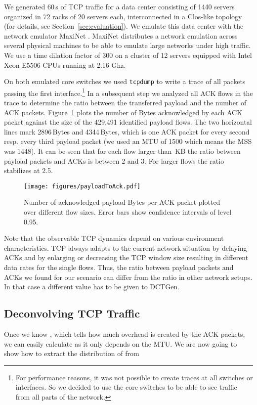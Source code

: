 \documentclass[journal,10pt]{IEEEtran}
\newcommand{\genname}{DCTGen}
\begin{document}
	
	We generated 60\,s of TCP traffic for a data center
	consisting of 1440 servers organized in 72 racks of 20 servers each, interconnected in a Clos-like topology (for details, see Section~\ref{sec:evaluation}).
	We emulate this data center with the network emulator MaxiNet \cite{wette14b}.
    \mbox{MaxiNet} distributes a network emulation across several physical machines
	to be able to emulate large networks under high traffic. We use a time dilation factor of 300 
	on a cluster of 12 servers equipped with Intel Xeon E5506 CPUs running at 2.16 Ghz.
	

	
	On both emulated core switches we used \texttt{tcpdump} to write a trace of all packets passing the first interface.\footnote{For performance reasons, it was not possible to create traces at all switches or interfaces. So we decided to use the core switches to be able to see traffic from all parts of the network.}
	In a subsequent step we analyzed all ACK flows in the trace to determine the ratio between the transferred payload and the number of ACK packets.
	Figure~\ref{fig:payloadToAck} plots the number of Bytes acknowledged by each ACK packet against the size of the 429,491 identified payload flows.
	The two horizontal lines mark 2896\,Bytes and 4344\,Bytes, which is one ACK packet for every second resp. every third payload packet (we used an MTU of 1500 which means the MSS was 1448).
	It can be seen that for each flow larger than \,KB the ratio between payload packets and ACKs is between 2 and 3. For larger flows
	the ratio stabilizes at 2.5.
	
\begin{figure}
	\centering
	\texttt{[image: figures/payloadToAck.pdf]}
	\caption{Number of acknowledged payload Bytes per ACK packet plotted over different flow sizes. Error bars show confidence intervals of level 0.95.}
	\label{fig:payloadToAck}
\end{figure}
	
	Note that the observable TCP dynamics depend on various environment characteristics.
	TCP always adapts to the current network situation by delaying ACKs and by enlarging or decreasing the TCP window size resulting in different data rates
	for the single flows.
Thus, the ratio between payload packets and ACKs we found for our scenario can differ from the ratio in other network setups.
	In that case a different  value has to be given to \genname{}.
	


\subsection{Deconvolving TCP Traffic}
	Once we know , which tells how much overhead is created by the ACK packets, we can easily calculate  as it only depends on the MTU.
	We are now going to show how to extract the distribution of  from
	
\end{document}

